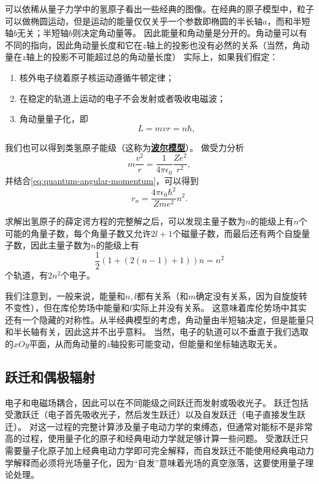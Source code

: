 \documentclass[UTF8, a4paper]{ctexart}
\newcommand*{\concept}[1]{\underline{\textbf{#1}}}
\begin{document}
可以依稀从量子力学中的氢原子看出一些经典的图像。在经典的原子模型中，粒子可以做椭圆运动，但是运动的能量仅仅关乎一个参数即椭圆的半长轴$a$，而和半短轴$b$无关；半短轴$b$则决定角动量等。
因此能量和角动量是分开的。角动量可以有不同的指向，因此角动量长度和它在$z$轴上的投影也没有必然的关系（当然，角动量在$z$轴上的投影不可能超过总的角动量长度）
实际上，如果我们假定：
\begin{enumerate}
    \item 核外电子绕着原子核运动遵循牛顿定律；
    \item 在稳定的轨道上运动的电子不会发射或者吸收电磁波；
    \item 角动量量子化，即
    \begin{equation}
        L = m v r = n \hbar,
        \label{eq:quantum-angular-momentum}
    \end{equation}
\end{enumerate}
我们也可以得到类氢原子能级（这称为\concept{波尔模型}）。
做受力分析
\[
    m \frac{v^2}{r} = \frac{1}{4\pi \epsilon_0} \frac{Z e^2}{r^2},
\]
并结合\eqref{eq:quantum-angular-momentum}，可以得到
\begin{equation}
    r_n = \frac{4\pi \epsilon_0 \hbar^2}{Zme^2} n^2.
\end{equation}

求解出氢原子的薛定谔方程的完整解之后，可以发现主量子数为$n$的能级上有$n$个可能的角量子数，每个角量子数又允许$2l+1$个磁量子数，而最后还有两个自旋量子数，因此主量子数为$n$的能级上有
\[
    \frac{1}{2} (1 + (2(n-1)+1)) n = n^2
\]
个轨道，有$2n^2$个电子。

我们注意到，一般来说，能量和$n, l$都有关系（和$m$确定没有关系，因为自旋旋转不变性），但在库伦势场中能量和$l$实际上并没有关系。
这意味着库伦势场中其实还有一个隐藏的对称性。从半经典模型的考虑，角动量由半短轴决定，但是能量只和半长轴有关，因此这并不出乎意料。
当然，电子的轨道可以不垂直于我们选取的$xOy$平面，从而角动量的$z$轴投影可能变动，但能量和坐标轴选取无关。

\subsection{跃迁和偶极辐射}\label{sec:electro-dipole}

电子和电磁场耦合，因此可以在不同能级之间跃迁而发射或吸收光子。
跃迁包括受激跃迁（电子首先吸收光子，然后发生跃迁）以及自发跃迁（电子直接发生跃迁）。
对这一过程的完整计算涉及量子电动力学的束缚态，但通常对能标不是非常高的过程，使用量子化的原子和经典电动力学就足够计算一些问题。
受激跃迁只需要量子化原子加上经典电动力学即可完全解释，而自发跃迁不能使用经典电动力学解释而必须将光场量子化，因为“自发”意味着光场的真空涨落，这要使用量子理论处理。
\end{document}
